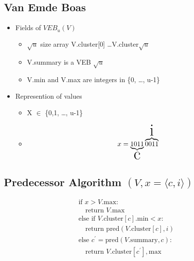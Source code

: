\documentclass[../../../include/open-logic-chapter]{subfiles}
\begin{document}
\subsection{Van Emde Boas}

\begin{itemize}
\item {Fields of $VEB_u (V)$}
\begin{itemize}
  \item \(\sqrt{u}\) size array  V.cluster[0] \dots V.cluster\(\sqrt{u}\)
  \item V.summary is a VEB \(\sqrt{u}\)
  \item V.min and V.max are integers in \{0, \dots, u-1\}
\end{itemize}

\end{itemize}

\begin{itemize}
\item {Represention of values}
\begin{itemize}
  \item  X \(\in\) \{0,1, \dots, u-1\}
  \item
\[
  x =
    \underbrace{1 0 1 1 }_\text{\Huge c}
    \overbrace{0 0 1 1}^\text{\Huge i}
\]
\end{itemize}

\end{itemize}

\subsection{\texorpdfstring {Predecessor Algorithm \(\left(V, x = \langle c,i \rangle\right)\)} {Predecessor Algorithm (V, x = <c,i>)}}
\Huge
\[
\begin{array}{l}
  \text{if } x > V.\text{max} : \\
  \quad \text{return } V.\text{max} \\
  \text{else if } V.\text{cluster}[c].\text{min} < x : \\
  \quad \text{return } \text{pred}(V.\text{cluster}[c], i) \\
  \text{else } c^{\prime} = \text{pred}(V.\text{summary}, c) : \\
  \quad \text{return } V.\text{cluster}[c^{\prime}], \text{max} \\
\end{array}
\]
\end{document}
